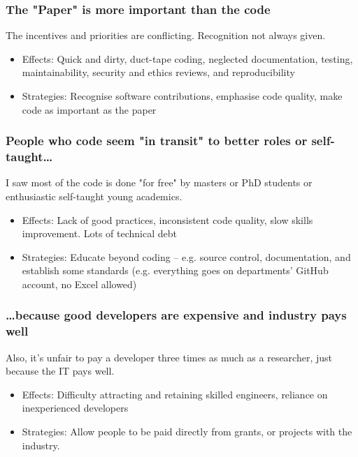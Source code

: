 \documentclass[14pt, aspectratio=169]{beamer}
\begin{document}
\begin{frame}
\frametitle{The "Paper" is more important than the code}
The incentives and priorities are conflicting. Recognition not always given.
\begin{itemize}
\item Effects: Quick and dirty, duct-tape coding, neglected documentation, testing, maintainability, security and ethics reviews, and reproducibility
\item Strategies: Recognise software contributions, emphasise code quality, make code as important as the paper
\end{itemize}
\end{frame}

\begin{frame}
\frametitle{People who code seem "in transit" to better roles or self-taught\ldots}
I saw most of the code is done "for free" by masters or PhD students or enthusiastic self-taught young academics.
\newline
\begin{itemize}
    \item Effects: Lack of good practices, inconsistent code quality, slow skills improvement. Lots of technical debt
    \item Strategies: Educate beyond coding -- e.g. source control, documentation, and establish some standards (e.g. everything goes on departments' GitHub account, no Excel allowed)
\end{itemize}
\end{frame}

\begin{frame}
\frametitle{\ldots because good developers are expensive and industry pays well}
Also, it's unfair to pay a developer three times as much as a researcher, just because the IT pays well.
\begin{itemize}
\item Effects: Difficulty attracting and retaining skilled engineers, reliance on inexperienced developers
\item Strategies: Allow people to be paid directly from grants, or projects with the industry. 
\end{itemize}
\end{frame}
\end{document}
